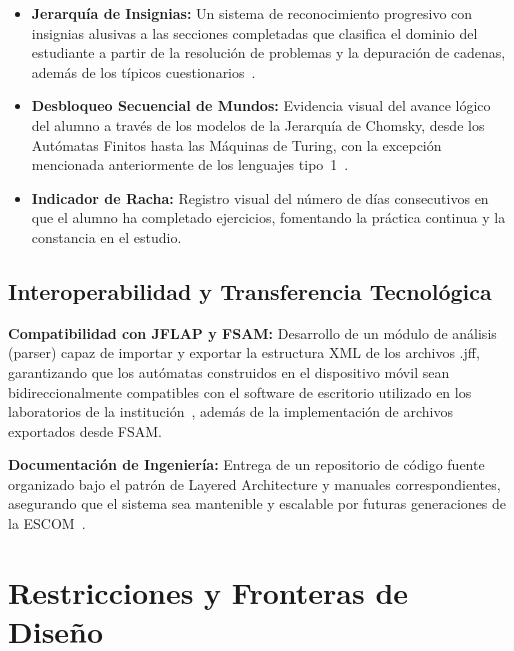 \begin{itemize}
    \item \textbf{Jerarquía de Insignias:} Un sistema de reconocimiento progresivo con
        insignias alusivas a las secciones completadas que clasifica el dominio del estudiante
        a partir de la resolución de problemas y la depuración de cadenas, además de los
        típicos cuestionarios~\cite{deterding2011}.

    \item \textbf{Desbloqueo Secuencial de Mundos:} Evidencia visual del avance lógico del
        alumno a través de los modelos de la Jerarquía de Chomsky, desde los Autómatas
        Finitos hasta las Máquinas de Turing, con la excepción mencionada anteriormente de
        los lenguajes tipo~1~\cite{hopcroft2007}.

    \item \textbf{Indicador de Racha:} Registro visual del número de días consecutivos en
        que el alumno ha completado ejercicios, fomentando la práctica continua y la
        constancia en el estudio.
\end{itemize}

\subsection{Interoperabilidad y Transferencia Tecnológica}
\label{ssec:interoperabilidad}

\textbf{Compatibilidad con JFLAP y FSAM:} Desarrollo de un módulo de análisis (parser) capaz
de importar y exportar la estructura XML de los archivos .jff, garantizando que los autómatas
construidos en el dispositivo móvil sean bidireccionalmente compatibles con el software de
escritorio utilizado en los laboratorios de la institución~\cite{rodger2006}, además de la
implementación de archivos exportados desde FSAM.

\textbf{Documentación de Ingeniería:} Entrega de un repositorio de código fuente organizado
bajo el patrón de Layered Architecture y manuales correspondientes, asegurando que el sistema
sea mantenible y escalable por futuras generaciones de la ESCOM~\cite{pressman2020, reenskaug1979}.

\section{Restricciones y Fronteras de Diseño}
\label{sec:restricciones}

